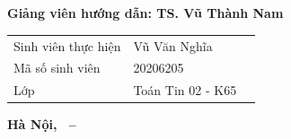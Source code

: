 \begin{titlepage}
\begin{center}
        \vspace{1cm}

        \textbf{\fontsize{16pt}{30pt}\selectfont {ĐỀ TÀI:}} \\


        \textbf{\fontsize{20pt}{24pt}\selectfont {Sử dụng thiết kế hướng miền \\ xây dựng kiến trúc vi dịch vụ cho \\ bài toán hóa đơn điện tử}} \\

\end{center}

\vspace{0.7cm}

\hspace{2.4cm}\begin{minipage}{0.8\textwidth}

\textbf{Giảng viên hướng dẫn: TS. Vũ Thành Nam}

\end{minipage}

\vspace{0.7cm}
\hspace{3cm}\begin{minipage}{0.7\textwidth}

\begin{tabular}{l l l}

Sinh viên thực hiện & Vũ Văn Nghĩa \\

Mã số sinh viên & 20206205 \\

Lớp & Toán Tin 02 - K65 \\

\end{tabular}

\end{minipage}

\vspace{0.5cm}

    \begin{center}

        \textbf{Hà Nội, \the\month~--~\the\year        }

    \end{center}

\end{titlepage}

